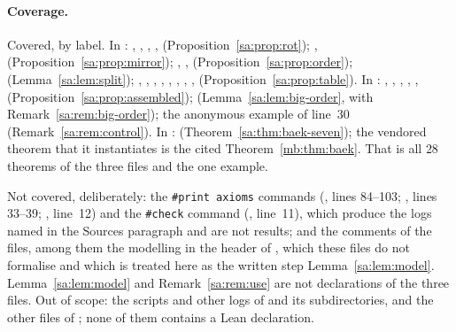 {\raggedright
\paragraph{Coverage.}
Covered, by label. In : , ,
, ,  (Proposition~\ref{sa:prop:rot});
,  (Proposition~\ref{sa:prop:mirror});
, , 
(Proposition~\ref{sa:prop:order});  (Lemma~\ref{sa:lem:split}); ,
, , , , ,
, ,  (Proposition~\ref{sa:prop:table}). In
: , ,
, , , 
(Proposition~\ref{sa:prop:assembled});  (Lemma~\ref{sa:lem:big-order}, with
Remark~\ref{sa:rem:big-order}); the anonymous example of line~30 (Remark~\ref{sa:rem:control}). In
:  (Theorem~\ref{sa:thm:baek-seven}); the vendored
theorem  that it instantiates is the cited Theorem~\ref{mb:thm:baek}. That is all $28$ theorems of the
three files and the one example.

Not covered, deliberately: the \texttt{\#print axioms} commands (, lines 84--103;
, lines 33--39; , line~12) and the \texttt{\#check} command
(, line~11), which produce the logs named in the Sources paragraph and are not results; and the
comments of the files, among them the modelling in the header of , which these files do not
formalise and which is treated here as the written step Lemma~\ref{sa:lem:model}. Lemma~\ref{sa:lem:model} and
Remark~\ref{sa:rem:use} are not declarations of the three files. Out of scope: the scripts and other logs of
 and its subdirectories, and the other files of ; none of
them contains a Lean declaration.\par}
